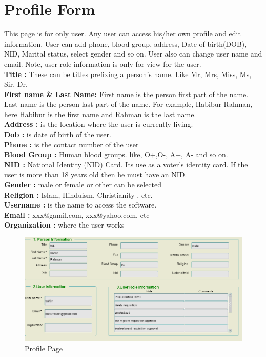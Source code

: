 \documentclass[12pt]{report} %
\begin{document}
\section{Profile Form}
This page is for only user. Any user can access his/her own profile and edit information. User can add phone, blood group, address, Date of birth(DOB), NID, Marital status, select gender and so on. User also can change user name and email. Note, user role information is only for view for the user.\\
\textbf{Title : } These can be titles prefixing a person's name. Like Mr, Mrs, Miss, Ms, Sir, Dr.\\
\textbf{First name \& Last Name: }First name is the person first part of the name. Last name is the person last part of the name. For example, Habibur Rahman, here Habibur is the first name and Rahman is the last name.\\
\textbf{Address :} is the location where the user is currently living.\\
\textbf{Dob :} is date of birth of the user.\\
\textbf{Phone :} is the contact number of the user\\
\textbf{Blood Group :} Human blood groups.  like, O+,O-, A+, A- and so on.\\
\textbf{NID :} National Identity (NID) Card. Its use as a voter's identity card. If the user is more than 18 years old then he must have an NID.\\
\textbf{Gender :} male or female or other can be selected\\
\textbf{Religion :} Islam, Hinduism, Christianity , etc.\\
\textbf{Username :} is the name to access the software.\\
\textbf{Email :} xxx@gamil.com, xxx@yahoo.com, etc\\
\textbf{Organization :} where the user works\\
\clearpage


\begin{figure}[h]
	\begin{center}
	\includegraphics[width=1.1\textwidth]{pic/profile.PNG}
	\end{center}
	\caption{Profile Page}
	\label{fig:profile}
\end{figure}
\end{document}

